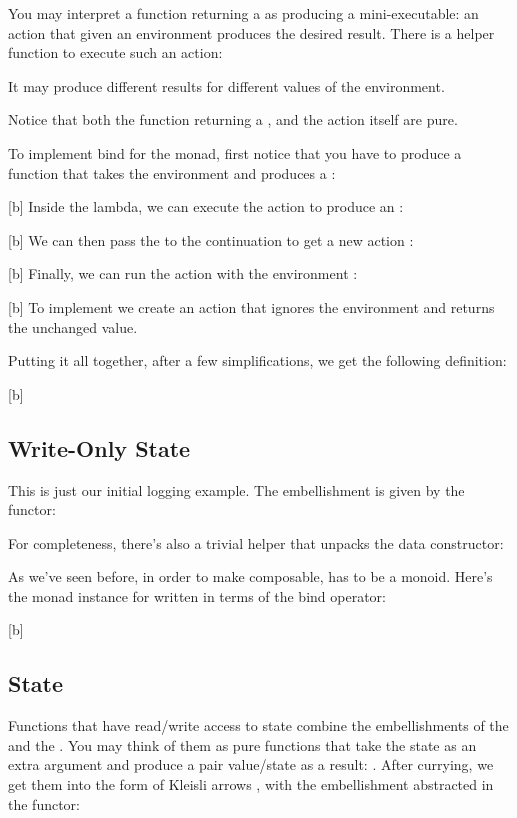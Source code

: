 You may interpret a function returning a  as producing a
mini-executable: an action that given an environment produces the
desired result. There is a helper function  to execute
such an action:

It may produce different results for different values of the
environment.

Notice that both the function returning a , and the
 action itself are pure.

To implement bind for the  monad, first notice that you
have to produce a function that takes the environment  and
produces a :

[b]
Inside the lambda, we can execute the action  to produce an
:

[b]
We can then pass the  to the continuation  to get a
new action :

[b]
Finally, we can run the action  with the environment
:

[b]
To implement  we create an action that ignores the
environment and returns the unchanged value.

Putting it all together, after a few simplifications, we get the
following definition:

[b]

\subsection{Write-Only State}

This is just our initial logging example. The embellishment is given by
the  functor:

For completeness, there's also a trivial helper  that
unpacks the data constructor:

As we've seen before, in order to make  composable,
 has to be a monoid. Here's the monad instance for
 written in terms of the bind operator:

[b]

\subsection{State}

Functions that have read/write access to state combine the
embellishments of the  and the . You may
think of them as pure functions that take the state as an extra argument
and produce a pair value/state as a result:
. After currying, we get them
into the form of Kleisli arrows
, with the
embellishment abstracted in the  functor:

